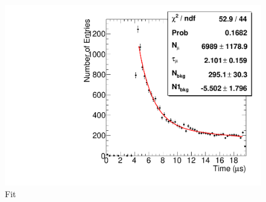 \begin{figure}[ht!]
  \centering
  \includegraphics[width=\columnwidth,keepaspectratio=true]{fit}
  \caption{Fit}
  \label{fig:fit}
\end{figure}


